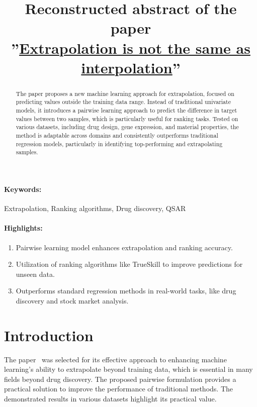 \documentclass[12pt]{article}
\title{Reconstructed abstract of the paper \\ ''\href{https://doi.org/10.1007/s10994-024-06591-2}{Extrapolation is not the same as interpolation}''}
\date{}
\begin{document}
\maketitle

\begin{abstract}
    The paper proposes a new machine learning approach for extrapolation, focused on predicting values outside the training data range. Instead of traditional univariate models, it introduces a pairwise learning approach to predict the difference in target values between two samples, which is particularly useful for ranking tasks. Tested on various datasets, including drug design, gene expression, and material properties, the method is adaptable across domains and consistently outperforms traditional regression models, particularly in identifying top-performing and extrapolating samples.
\end{abstract}
\paragraph{Keywords:} Extrapolation, Ranking algorithms, Drug discovery, QSAR

\paragraph{Highlights:}
\begin{enumerate}
    \item Pairwise learning model enhances extrapolation and ranking accuracy.
    \item Utilization of ranking algorithms like TrueSkill to improve predictions for unseen data.
    \item Outperforms standard regression methods in real-world tasks, like drug discovery and stock market analysis.
\end{enumerate}

\section{Introduction}
The paper~\cite{Extrapolation} was selected for its effective approach to enhancing machine learning's ability to extrapolate beyond training data, which is essential in many fields beyond drug discovery. The proposed pairwise formulation provides a practical solution to improve the performance of traditional methods. The demonstrated results in various datasets highlight its practical value.



\end{document}
